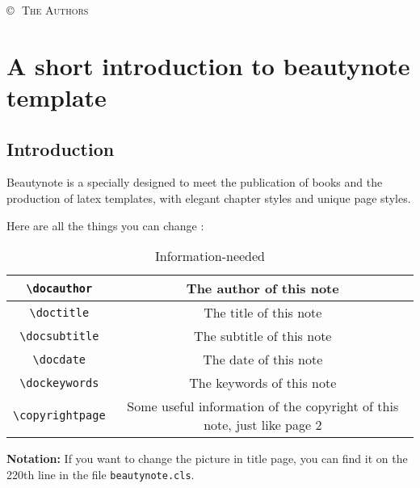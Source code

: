 \documentclass[twoside,openany,12pt]{beautynote}
\date{\today\vfill\texttt{[image: titlepage.png]}\\[.1em] \textsc{\large Beautynote}}
\author{Ethan Lu}
\begin{document}
\maketitle\clearpage
\copyrights
\pagestyle{\auxsettings}
\makeatletter
\thispagestyle{copyright}
\ifdefempty{\@faculty}{}{\noindent{\large\textsc{\@faculty}} \\}
\ifdefempty{\@university}{}{{\large\textsc{\@university}} \\[1em]}
\vfill
{}
\copyright\,\the\year\, \textsc{The Authors}
\doclicenseThis
\cleardoublepage
\makeatother
    \tableofcontents
\pagestyle{\defaultsettings}
\chapter{A short introduction to beautynote template}
\section{Introduction}

Beautynote is a specially designed to meet the publication of books and the production of latex templates, with elegant chapter styles and unique page styles.

Here are all the things you can change : 
\begin{table}[!htbp]
    \centering %
    \caption{Information-needed}
    \begin{tabular}{c|c}
        \toprule
        \lstinline|\docauthor| & The author of this note\\ \midrule
        \lstinline|\doctitle| & The title of this note\\ \midrule
        \lstinline|\docsubtitle| & The subtitle of this note\\ \midrule
        \lstinline|\docdate| & The date of this note\\ \midrule
        \lstinline|\dockeywords| & The keywords of this note\\ \midrule %
        \lstinline|\copyrightpage| & Some useful information of the copyright of this note, just like page 2\\
        \bottomrule
    \end{tabular}
    \label{tb:Information-needed}
\end{table}
\textbf{Notation:} If you want to change the picture in title page, you can find it on the 220th line in the file \lstinline{beautynote.cls}.
\end{document}
